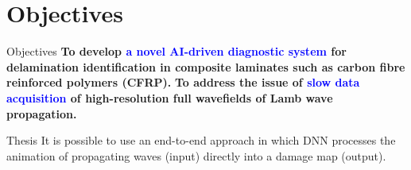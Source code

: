 \documentclass[10pt,aspectratio=169,dvipsnames]{beamer} %
\begin{document}
	\section{Objectives}
	\begin{frame}{Objectives}
		\textbf{To develop \textcolor{blue}{a novel AI-driven diagnostic system} for delamination identification in composite laminates such as carbon fibre reinforced polymers (CFRP).}
		\vfil
		\textbf{To address the issue of \textcolor{blue}{slow data acquisition} of high-resolution full wavefields of Lamb wave propagation.}
		\begin{alertblock}{Thesis}
			It is possible to use an end-to-end approach in which DNN 
			processes the animation of propagating waves (input) directly into a damage map (output).
		\end{alertblock}
	\end{frame}
\end{document}
